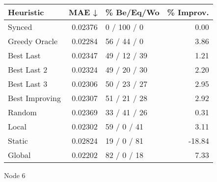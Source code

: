 \begin{tabular}{lrlr}
\toprule
\textbf{Heuristic} & \textbf{MAE ↓} & \textbf{\% Be/Eq/Wo} & \textbf{\% Improv.} \\
\midrule
            Synced &        0.02376 &          0 / 100 / 0 &                0.00 \\
     Greedy Oracle &        0.02284 &          56 / 44 / 0 &                3.86 \\
         Best Last &        0.02347 &         49 / 12 / 39 &                1.21 \\
       Best Last 2 &        0.02324 &         49 / 20 / 30 &                2.20 \\
       Best Last 3 &        0.02306 &         50 / 23 / 27 &                2.95 \\
    Best Improving &        0.02307 &         51 / 21 / 28 &                2.92 \\
            Random &        0.02369 &         33 / 41 / 26 &                0.31 \\
             Local &        0.02302 &          59 / 0 / 41 &                3.11 \\
            Static &        0.02824 &          19 / 0 / 81 &              -18.84 \\
            Global &        0.02202 &          82 / 0 / 18 &                7.33 \\
\bottomrule
\end{tabular}
\caption{Node 6}
\label{tab:iid_lr01_le1_bs2_6}

